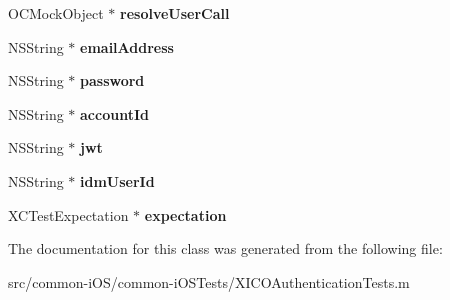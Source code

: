\begin{DoxyCompactItemize}
\hypertarget{interface_x_i_c_o_authentication_tests_abba47ea99be1d26f35f08bc396c0b96f}{}\label{interface_x_i_c_o_authentication_tests_abba47ea99be1d26f35f08bc396c0b96f} 
O\+C\+Mock\+Object $\ast$ {\bfseries resolve\+User\+Call}
\item 
\hypertarget{interface_x_i_c_o_authentication_tests_a40f9bc5ee16ecfd6fd9d10601efec293}{}\label{interface_x_i_c_o_authentication_tests_a40f9bc5ee16ecfd6fd9d10601efec293} 
N\+S\+String $\ast$ {\bfseries email\+Address}
\item 
\hypertarget{interface_x_i_c_o_authentication_tests_af351e0e87791292947248ae1f188f22b}{}\label{interface_x_i_c_o_authentication_tests_af351e0e87791292947248ae1f188f22b} 
N\+S\+String $\ast$ {\bfseries password}
\item 
\hypertarget{interface_x_i_c_o_authentication_tests_a23bc1a811a05de8e5366142e43c5fcf9}{}\label{interface_x_i_c_o_authentication_tests_a23bc1a811a05de8e5366142e43c5fcf9} 
N\+S\+String $\ast$ {\bfseries account\+Id}
\item 
\hypertarget{interface_x_i_c_o_authentication_tests_a7b8f4dbbf5e305077bfd4a356cb568e2}{}\label{interface_x_i_c_o_authentication_tests_a7b8f4dbbf5e305077bfd4a356cb568e2} 
N\+S\+String $\ast$ {\bfseries jwt}
\item 
\hypertarget{interface_x_i_c_o_authentication_tests_a7c5981910a7d5ea231a1d7267275f5a8}{}\label{interface_x_i_c_o_authentication_tests_a7c5981910a7d5ea231a1d7267275f5a8} 
N\+S\+String $\ast$ {\bfseries idm\+User\+Id}
\item 
\hypertarget{interface_x_i_c_o_authentication_tests_ad7ba7bcd5f74da3b3c4d9132f4944228}{}\label{interface_x_i_c_o_authentication_tests_ad7ba7bcd5f74da3b3c4d9132f4944228} 
X\+C\+Test\+Expectation $\ast$ {\bfseries expectation}
\end{DoxyCompactItemize}


The documentation for this class was generated from the following file\+:\begin{DoxyCompactItemize}
\item 
src/common-\/i\+O\+S/common-\/i\+O\+S\+Tests/X\+I\+C\+O\+Authentication\+Tests.\+m\end{DoxyCompactItemize}
